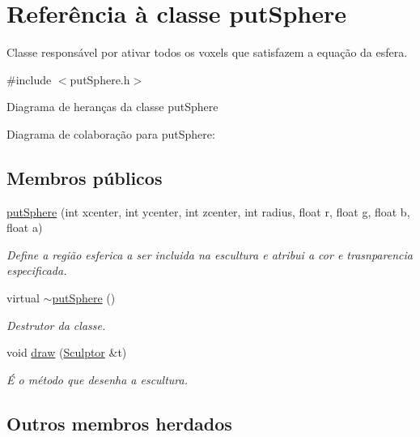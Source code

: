 \hypertarget{classput_sphere}{}\section{Referência à classe put\+Sphere}
\label{classput_sphere}


Classe responsável por ativar todos os voxels que satisfazem a equação da esfera.  




{\ttfamily \#include $<$put\+Sphere.\+h$>$}



Diagrama de heranças da classe put\+Sphere


Diagrama de colaboração para put\+Sphere\+:
\subsection*{Membros públicos}
\begin{DoxyCompactItemize}
\item 
\hyperlink{classput_sphere_a186ac51400d1d79a1e6060e56a90e32a}{put\+Sphere} (int xcenter, int ycenter, int zcenter, int radius, float r, float g, float b, float a)
\begin{DoxyCompactList}\small\item\em Define a região esferica a ser incluida na escultura e atribui a cor e trasnparencia especificada. \end{DoxyCompactList}\item 
\mbox{\label{classput_sphere_ad155ede271354612fa57a2638538434b}} 
virtual \hyperlink{classput_sphere_ad155ede271354612fa57a2638538434b}{$\sim$put\+Sphere} ()
\begin{DoxyCompactList}\small\item\em Destrutor da classe. \end{DoxyCompactList}\item 
void \hyperlink{classput_sphere_addd9a9936084a1f83bd22973c6e3da16}{draw} (\hyperlink{class_sculptor}{Sculptor} \&t)
\begin{DoxyCompactList}\small\item\em É o método que desenha a escultura. \end{DoxyCompactList}\end{DoxyCompactItemize}
\subsection*{Outros membros herdados}


